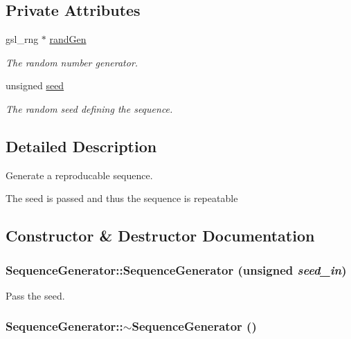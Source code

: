 \subsection*{Private Attributes}
\begin{CompactItemize}
\item 
gsl\_\-rng $\ast$ \hyperlink{classSequenceGenerator_d6033e82add37b0274c09f12ceb52b46}{randGen}
\begin{CompactList}\small\item\em The random number generator. \item\end{CompactList}\item 
unsigned \hyperlink{classSequenceGenerator_85f49d98c11df6ec9647eada74178a32}{seed}
\begin{CompactList}\small\item\em The random seed defining the sequence. \item\end{CompactList}\end{CompactItemize}


\subsection{Detailed Description}
Generate a reproducable sequence. 

The seed is passed and thus the sequence is repeatable 

\subsection{Constructor \& Destructor Documentation}
\hypertarget{classSequenceGenerator_0348a93ab1b1f0fdcc15f4ba08654395}{
\subsubsection{\setlength{\rightskip}{0pt plus 5cm}SequenceGenerator::SequenceGenerator (unsigned {\em seed\_\-in})}}
\label{classSequenceGenerator_0348a93ab1b1f0fdcc15f4ba08654395}


Pass the seed. 

\hypertarget{classSequenceGenerator_73b695e0f3353100e6476dbac4ab39a4}{
\subsubsection{\setlength{\rightskip}{0pt plus 5cm}SequenceGenerator::$\sim$SequenceGenerator ()}}
\label{classSequenceGenerator_73b695e0f3353100e6476dbac4ab39a4}


